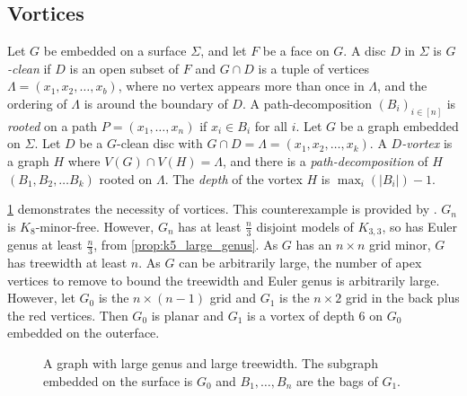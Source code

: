 \subsection{Vortices}\label{sssec:vortices}
Let \(G\) be embedded on a surface \(\Sigma\), and let \(F\) be a face on \(G\). A disc $D$ in $\Sigma$ is \textit{$G$-clean} if $D$ is an open subset of $F$ and $G \cap D$ is a tuple of vertices \(\Lambda = (x_1, x_2, \ldots, x_b)\), where no vertex appears more than once in $\Lambda$, and the ordering of $\Lambda$ is around the boundary of $D$. A path-decomposition $(B_i)_{i \in [n]}$ is \textit{rooted} on a path $P = (x_1, \ldots, x_n)$ if $x_i \in B_i$ for all $i$.
Let $G$ be a graph embedded on $\Sigma$. Let $D$ be a $G$-clean disc with $G \cap D = \Lambda = (x_1, x_2, \ldots, x_k)$. A \textit{$D$-vortex} is a graph $H$ where $V(G) \cap V(H) = \Lambda$, and there is a \textit{path-decomposition} of \(H\) \((B_1, B_2, \ldots B_k)\) rooted on $\Lambda$. The \textit{depth} of the vortex $H$ is $\max_{i}(|B_i|) - 1$. 

\cref{fig:tenniscourt} demonstrates the necessity of vortices. This counterexample is provided by \textcite{seeseGridsTheirMinors1989}. $G_n$ is $K_8$-minor-free. However, $G_n$ has at least $\frac{n}{3}$ disjoint models of $K_{3,3}$, so has Euler genus at least $\frac{n}{3}$, from \cref{prop:k5_large_genus}. As $G$ has an $n \times n$ grid minor, $G$ has treewidth at least $n$. As $G$ can be arbitrarily large, the number of apex vertices to remove to bound the treewidth and Euler genus is arbitrarily large. However, let $G_0$ is the $n \times (n - 1)$ grid and $G_1$ is the $n \times 2$ grid in the back plus the red vertices. Then $G_0$ is planar and $G_1$ is a vortex of depth 6 on $G_0$ embedded on the outerface.

\begin{figure}[h]
	\centering
	
	\caption[Graph vortex counterexample]{A graph with large genus and large treewidth. The subgraph embedded on the surface is $G_0$ and $B_1, \ldots, B_n$ are the bags of $G_1$.}\label{fig:tenniscourt}
\end{figure}
